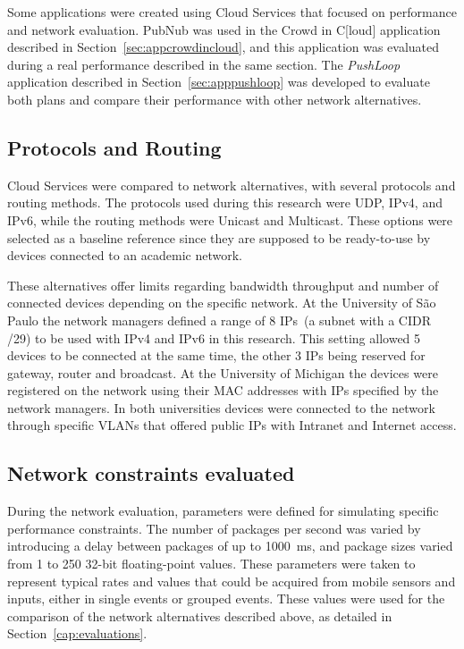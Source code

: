 Some applications were created using Cloud Services that focused on performance and network evaluation.
PubNub was used in the Crowd in C[loud] application described in Section~\ref{sec:appcrowdincloud}, and this application was evaluated during a real performance described in the same section.
The \textit{PushLoop} application described in Section~\ref{sec:apppushloop} was developed to evaluate both plans and compare their performance with other network alternatives.

\subsection*{Protocols and Routing}

Cloud Services were compared to network alternatives, with several protocols and routing methods.
The protocols used during this research were UDP, IPv4, and IPv6, while the routing methods were Unicast and Multicast.
These options were selected as a baseline reference since they are supposed to be ready-to-use by devices connected to an academic network.

These alternatives offer limits regarding bandwidth throughput and number of connected devices depending on the specific network.
At the University of São Paulo the network managers defined a range of 8 IPs~(a subnet with a CIDR /29) to be used with IPv4 and IPv6 in this research.
This setting allowed 5 devices to be connected at the same time, the other 3 IPs being reserved for gateway, router and broadcast.
At the University of Michigan the devices were registered on the network using their MAC addresses with IPs specified by the network managers.
In both universities devices were connected to the network through specific VLANs that offered public IPs with Intranet and Internet access.

\subsection*{Network constraints evaluated}

During the network evaluation, parameters were defined for simulating specific performance constraints.
The number of packages per second was varied by introducing a delay between packages of up to 1000~ms, and package sizes varied from 1 to 250 32-bit floating-point values. These parameters were taken to represent typical rates and values that could be acquired from mobile sensors and inputs, either in single events or grouped events.
These values were used for the comparison of the network alternatives described above, as detailed in Section~\ref{cap:evaluations}.


